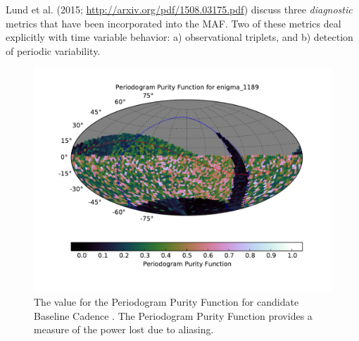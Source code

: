 Lund et al. (2015; \url{http://arxiv.org/pdf/1508.03175.pdf}) discuss
three {\it diagnostic} metrics that have been incorporated into the MAF. Two of these
metrics deal explicitly with time variable behavior: a) observational
triplets, and b) detection of periodic variability.

\begin{figure}[tbh!]
\includegraphics{figs/variables/enigma_1189_PeriodogramPurity_OPSI_SkyMap.pdf}
\caption{The value for the Periodogram Purity Function for candidate
Baseline Cadence . The Periodogram Purity
Function provides a measure of the power lost due to aliasing.}
\label{fig:enigmaPeriodogramPurity}
\end{figure}


